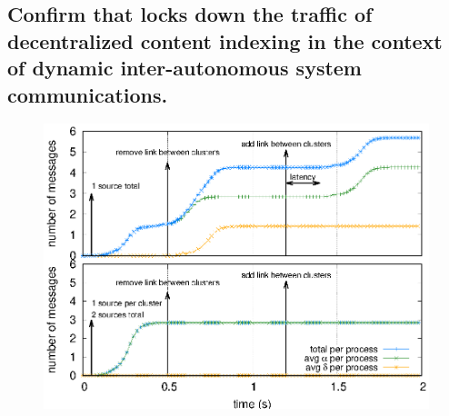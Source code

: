 
\subsection{Confirm that \NAME locks down the traffic of decentralized content
  indexing in the context of dynamic inter-autonomous system
  communications.}

\begin{figure}
  \centering\includegraphics[width=0.99\columnwidth]{img/as_cast_geant.eps}
  \caption{\label{fig:geant}}
\end{figure}

